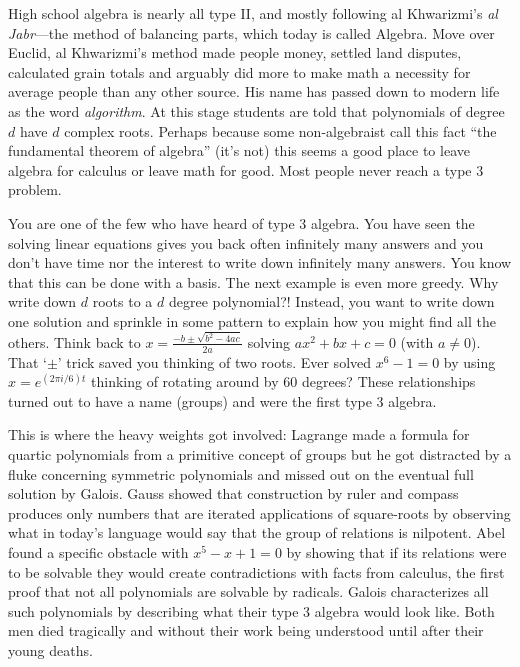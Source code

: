 High school algebra is nearly all type II, and mostly following al
Khwarizmi's \emph{al Jabr}---the method of balancing parts, which today is
called Algebra.  Move over Euclid, al Khwarizmi's method made people money,
settled land disputes, calculated grain totals and arguably did more to make
math a necessity for average people than any other source. His name has passed
down to modern life as the word \emph{algorithm}. At this stage students are
told  that polynomials of degree $d$ have $d$ complex roots.  Perhaps because
some non-algebraist call this fact ``the fundamental theorem of algebra'' (it's
not) this seems a good place to leave algebra for calculus or leave math for
good.  Most people never reach a type 3 problem.

You are one of the few who have heard of type 3 algebra.
You have seen the solving linear equations gives you back often infinitely many 
answers and you don't have time nor the interest to write down infinitely many answers.
You know that this can be done with a basis.  The next example is even more 
greedy.  Why write down $d$ roots to a $d$ degree polynomial?!  Instead, you 
want to write down one solution and sprinkle in some pattern to explain how you 
might find all the others.  Think back to 
$x=\frac{-b\pm \sqrt{b^2-4ac}}{2a}$ solving $ax^2+bx+c=0$ (with $a\neq 0$).
That `$\pm$' trick saved you thinking of two roots.  Ever solved $x^6-1=0$ by 
using $x=e^{(2\pi i/6) t}$ thinking of rotating around by 60 degrees?  
These relationships turned out to have a name (groups) and were the first type 3 
algebra.

This is where the heavy weights got
involved: Lagrange made a formula for quartic polynomials from a primitive
concept of groups but he got distracted by a fluke concerning symmetric polynomials 
and missed out on the eventual full solution by Galois.
Gauss showed that construction by ruler and compass produces only numbers 
that are iterated applications of square-roots by observing what in today's 
language would say that the group of relations is nilpotent. 
Abel found a specific obstacle with $x^5-x+1=0$ by showing that if its relations 
were to be solvable they would create contradictions with facts from calculus,
the first proof that not all polynomials are solvable by radicals.  
Galois characterizes all such polynomials by describing what their type 3
algebra would look like.  Both men died tragically and without their work being 
understood until after their young deaths.

